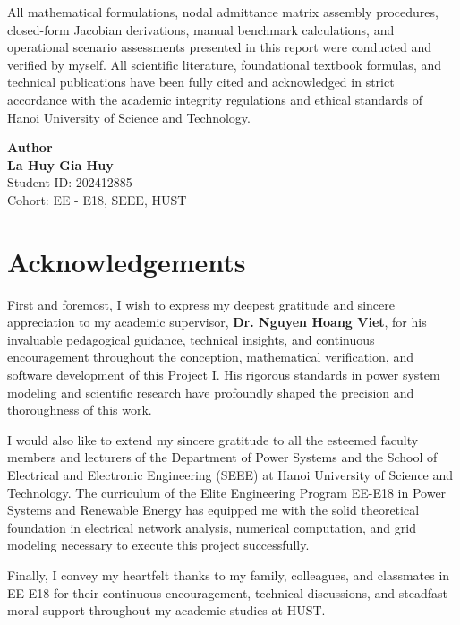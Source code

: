 \documentclass[12pt,a4paper,oneside]{report}
\begin{document}
All mathematical formulations, nodal admittance matrix assembly procedures, closed-form Jacobian derivations, manual benchmark calculations, and operational scenario assessments presented in this report were conducted and verified by myself. All scientific literature, foundational textbook formulas, and technical publications have been fully cited and acknowledged in strict accordance with the academic integrity regulations and ethical standards of Hanoi University of Science and Technology.

\vspace{45pt}
\begin{flushright}
    \textbf{Author}\\[45pt]
    \textbf{La Huy Gia Huy}\\
    Student ID: 202412885\\
    Cohort: EE - E18, SEEE, HUST
\end{flushright}

\clearpage

\chapter*{Acknowledgements}

First and foremost, I wish to express my deepest gratitude and sincere appreciation to my academic supervisor, \textbf{Dr. Nguyen Hoang Viet}, for his invaluable pedagogical guidance, technical insights, and continuous encouragement throughout the conception, mathematical verification, and software development of this Project I. His rigorous standards in power system modeling and scientific research have profoundly shaped the precision and thoroughness of this work.

I would also like to extend my sincere gratitude to all the esteemed faculty members and lecturers of the Department of Power Systems and the School of Electrical and Electronic Engineering (SEEE) at Hanoi University of Science and Technology. The curriculum of the Elite Engineering Program EE-E18 in Power Systems and Renewable Energy has equipped me with the solid theoretical foundation in electrical network analysis, numerical computation, and grid modeling necessary to execute this project successfully.

Finally, I convey my heartfelt thanks to my family, colleagues, and classmates in EE-E18 for their continuous encouragement, technical discussions, and steadfast moral support throughout my academic studies at HUST.
\end{document}
